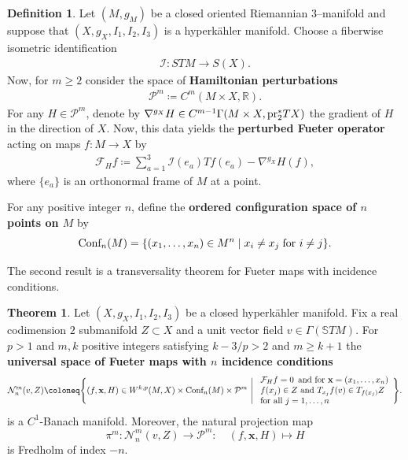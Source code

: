 \documentclass[11pt,a4paper]{article}
\theoremstyle{definition}
\newtheorem{definition}[theorem]{Definition}
\newtheorem{ingredient}{Theorem}
\newcommand{\pr}{\textnormal{pr}}
\newcommand{\Conf}{\textnormal{Conf}}
\newcommand{\cF}{\mathcal{F}}
\newcommand{\cI}{\mathcal{I}}
\newcommand{\cP}{\mathcal{P}}
\newcommand{\cN}{\mathcal{N}}
\newcommand{\bR}{\mathbb{R}}
\newcommand{\bx}{\mathbf{x}}
\begin{document}
\begin{definition}\label{Setup}
    Let $(M, g_M)$ be a closed oriented Riemannian $3$--manifold and suppose that $(X, g_X, I_1, I_2, I_3)$ is a hyperk\"ahler manifold. Choose a fiberwise isometric identification
    \begin{align*}
        \cI: STM \to S(X).
    \end{align*} 
    Now, for $m \geq 2$ consider the space of \textbf{Hamiltonian perturbations}
    \begin{align*}
        \cP^m \coloneq C^m(M \times X, \bR).
    \end{align*}
    For any $H \in \cP^m$, denote by $\nabla^{g_X} H \in C^{m-1}\Gamma(M \times X, \pr_2^* TX)$ the gradient of $H$ in the direction of $X$. Now, this data yields the \textbf{perturbed Fueter operator} acting on maps $f: M \to X$ by
    \begin{align*}
        \cF_H f \coloneq \sum_{a=1}^3 \cI(e_a) Tf(e_a) - \nabla^{g_X} H (f),
    \end{align*}
    where $\{e_a \}$ is an orthonormal frame of $M$ at a point.

    For any positive integer $n$, define the \textbf{ordered configuration space of $n$ points on $M$} by
    \begin{equation*}
        \Conf_n (M) = \{(x_1, \dots, x_n) \in M^n \; | \; x_i \neq x_j \; \textnormal{for } i \neq j\}.
    \end{equation*}
\end{definition}

The second result is a transversality theorem for Fueter maps with incidence conditions.

\begin{ingredient}\label{thm:B}
    Let $(X, g_X, I_1, I_2, I_3)$ be a closed hyperk\"ahler manifold. Fix a real codimension $2$ submanifold $Z \subset X$ and a unit vector field $v \in \Gamma(\mathbb{S}TM)$. For $p>1$ and $m, k$ positive integers satisfying $k-3/p>2$ and $m \geq k+1$ the \textbf{universal space of Fueter maps with $n$ incidence conditions}
    \begin{equation*}
        \cN^m_n(v, Z) \coloneq
        \Bigg\{ (f, \bx, H ) \in W^{k, p}(M, X) \times \Conf_n (M) \times \cP^m \ \Bigg|\
        \begin{array}{l}
            \cF_H f = 0 \, \text{ and for } \bx = (x_1 , \dots, x_n)\\
            f(x_j) \in Z \text{ and } T_{x_j}f(v) \in T_{f(x_j)}Z \\
            \text{for all } j= 1, \dots, n
        \end{array}
        \Bigg\}.
    \end{equation*}
    is a $C^1$-Banach manifold. Moreover, the natural projection map
    \begin{equation*}
        \pi^m: \cN^m_n (v, Z) \to \cP^m: \quad (f, \bx, H ) \mapsto H
    \end{equation*}
    is Fredholm of index $-n$.
\end{ingredient}
\end{document}
